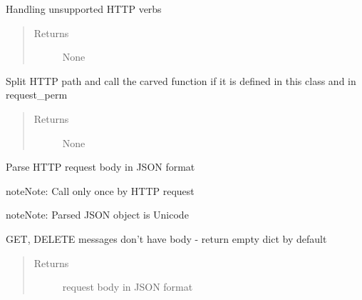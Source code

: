 \documentclass[letterpaper,10pt,english]{sphinxmanual}
\begin{document}
\begin{fulllineitems}
\begin{fulllineitems}
\label{util/api:escape.util.api.AbstractRequestHandler.do_CONNECT}
Handling unsupported HTTP verbs
\begin{quote}\begin{description}
\item[{Returns}] \leavevmode
None

\end{description}\end{quote}

\end{fulllineitems}


\begin{fulllineitems}
\label{util/api:escape.util.api.AbstractRequestHandler._process_url}
Split HTTP path and call the carved function if it is defined in this class
and in request\_perm
\begin{quote}\begin{description}
\item[{Returns}] \leavevmode
None

\end{description}\end{quote}

\end{fulllineitems}


\begin{fulllineitems}
\label{util/api:escape.util.api.AbstractRequestHandler._parse_json_body}
Parse HTTP request body in JSON format

\begin{notice}{note}{Note:}
Call only once by HTTP request
\end{notice}

\begin{notice}{note}{Note:}
Parsed JSON object is Unicode
\end{notice}

GET, DELETE messages don't have body - return empty dict by default
\begin{quote}\begin{description}
\item[{Returns}] \leavevmode
request body in JSON format


\end{description}
\end{quote}
\end{fulllineitems}
\end{fulllineitems}
\end{document}
